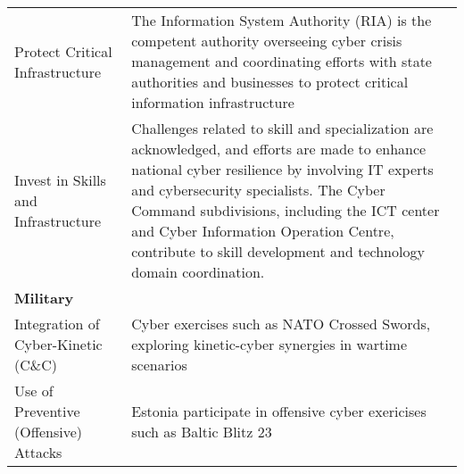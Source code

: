 \begin{table}[h]
\begin{tabular}{>{\raggedright}p{4cm} p{11cm}}
\hspace{0.2cm} Protect Critical Infrastructure & The Information System Authority (RIA) is the competent authority overseeing cyber crisis management and coordinating efforts with state authorities and businesses to protect critical information infrastructure \\
\hspace{0.2cm} Invest in Skills and Infrastructure &  Challenges related to skill and specialization are acknowledged, and efforts are made to enhance national cyber resilience by involving IT experts and cybersecurity specialists. The Cyber Command subdivisions, including the ICT center and Cyber Information Operation Centre, contribute to skill development and technology domain coordination. \\
\midrule
\textbf{Military} & \\
\hspace{0.2cm} Integration of Cyber-Kinetic (C\&C) &  Cyber exercises such as NATO Crossed Swords, exploring kinetic-cyber synergies in wartime scenarios \\
\hspace{0.2cm} Use of Preventive (Offensive) Attacks & Estonia participate in offensive cyber exericises such as Baltic Blitz 23 \\
\bottomrule
\end{tabular}
\end{table}


